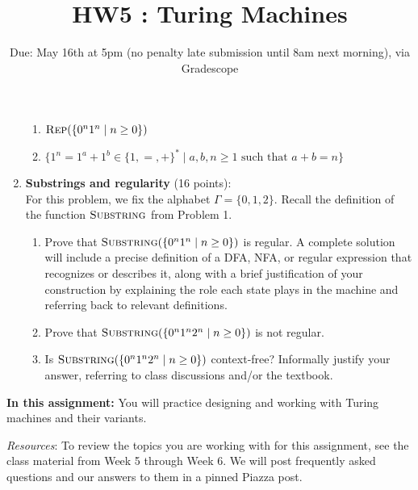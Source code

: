 \begin{enumerate}
\begin{enumerate}
    \item\gradeCorrect $\textsc{Rep}(\{0^n1^n \mid n \ge 0\})$

    \item\gradeCorrect $\{1^n = 1^a + 1^b \in \{1,=,+\}^* \mid a,b,n \ge 1 \text{ such that } a + b = n \}$
\end{enumerate}

\item \textbf{Substrings and regularity} (16 points): \\
For this problem, we fix the 
alphabet $\Gamma = \{0,1,2\}$. Recall the 
definition of the function $\textsc{Substring}$ from 
Problem 1.
\begin{enumerate}
\item\gradeCorrect Prove that $\textsc{Substring}(\{ 0^n 1^n \mid n \ge 0\})$ is regular.
A complete 
solution will include a 
precise definition of a DFA, NFA, or regular 
expression that recognizes or describes it, along 
with a brief justification
of your construction by explaining the role each 
state plays in the machine
and referring back to relevant definitions.
\item\gradeCorrect Prove that 
$\textsc{Substring}(\{ 0^n 1^n 2^n \mid n \ge 0\})$
is not regular.
\item\gradeComplete Is  $\textsc{Substring}(\{ 0^n 1^n 2^n \mid n \ge 0\})$
context-free?
Informally justify your answer, referring 
to class discussions and/or the textbook.

\end{enumerate}
\end{enumerate}

\newpage

\newcommand{\blank}{\scalebox{1.5}{\textvisiblespace}}
\newcommand{\corrupted}{\text{\lightning}}

\title{HW5 : Turing Machines}
\date{Due: May 16th at 5pm (no penalty late submission until 8am next morning), via Gradescope}


\maketitle
\thispagestyle{fancy}

\textbf{In this assignment:} You will practice designing and working with Turing machines and their variants.

\textit{Resources}: To review the topics you are working with for this assignment, 
see the class material from Week 5 through Week 6. We will post frequently asked questions 
and our answers to them in a pinned Piazza post.

